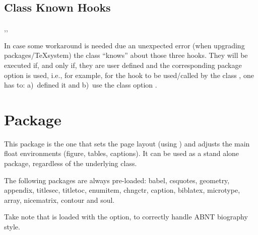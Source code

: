 \documentclass[dctools,english,tocdepth=3,secdepth=3]{ufrgscca} %
\begin{document}
\subsection{Class Known Hooks}
\begin{Macros}{\miktexHack,\overleafHack,\livetexHack}
    \begin{Syntax}%
        \Macro{\miktexHack}{}
        \Macro{\overleafHack}{}
        \Macro{\livetexHack}{}
    \end{Syntax}
    In case some workaround is needed due an unexpected error (when upgrading packages/\TeX system) the class “knows” about those three hooks.
    They will be executed if, and only if, they are user defined and the corresponding package option is used, i.e., for example, for the hook \Macro{\miktexHack}{} to be used/called by the class , one has to: a)~defined it and b)~use the class option .
\end{Macros}


\section{ Package}
This package is the one that sets the page layout (using ) and adjusts the main float environments (figure, tables, captions).
It can be used as a stand alone package, regardless of the underlying class.

The following packages are always pre-loaded: {\MetaFmt[Pack]\sffamily babel, csquotes, geometry, appendix, titlesec, titletoc, enumitem, chngctr, caption, biblatex, microtype, array, nicematrix, contour} and {\MetaFmt[Pack]\sffamily soul}.

Take note that  is loaded with the \textbf{} option, to correctly handle ABNT biography style.
\end{document}
